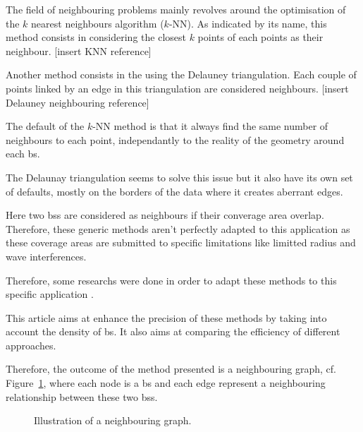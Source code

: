 \documentclass[lettersize,journal,english]{IEEEtran}
\begin{document}
    The field of neighbouring problems mainly revolves around the optimisation of the $k$ nearest neighbours algorithm ($k$-NN).
    As indicated by its name, this method consists in considering the closest $k$ points of each points as their neighbour.
    [insert KNN reference]

    Another method consists in the using the Delauney triangulation. Each couple of points linked by an edge in this triangulation are considered neighbours.
    [insert Delauney neighbouring reference]

    The default of the $k$-NN method is that it always find the same number of neighbours to each point, independantly to the reality of the geometry around each \acrshort{bs}.
    
    The Delaunay triangulation seems to solve this issue but it also have its own set of defaults, mostly on the borders of the data where it creates aberrant edges.

    Here two \acrshort{bs}s are considered as neighbours if their converage area overlap. Therefore, these generic methods aren't perfectly adapted to this application as these coverage areas are submitted to specific limitations like limitted radius and wave interferences.

    Therefore, some researchs were done in order to adapt these methods to this specific application \cite{patent_neighs}.

    This article aims at enhance the precision of these methods by taking into account the density of \acrshort{bs}. It also aims at comparing the efficiency of different approaches. 

    Therefore, the outcome of the method presented is a neighbouring graph, cf. Figure~\ref{fig:neigh_graph}, where each node is a \acrshort{bs} and each edge represent a neighbouring relationship between these two \acrshort{bs}s.
    \begin{figure}
        \centering
        \caption{Illustration of a neighbouring graph.}
        \label{fig:neigh_graph}
    \end{figure}
\end{document}
